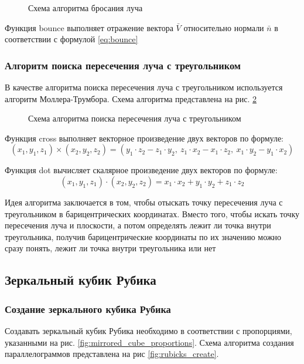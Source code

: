 \begin{figure}[!ht]
	\caption{Схема алгоритма бросания луча}
	\label{fig:throw_ray}
\end{figure}

Функция bounce выполняет отражение вектора $\bar V$ относительно нормали $\bar n$ в соответствии с формулой \ref{eq:bounce}

\subsubsection{Алгоритм поиска пересечения луча с треугольником}
В качестве алгоритма поиска пересечения луча с треугольником используется алгоритм Моллера-Трумбора\cite{bib:mollertrumbor}. Схема алгоритма представлена на рис. \ref{fig:triangle_intersec}
\begin{figure}[!ht]
	\caption{Схема алгоритма поиска пересечения луча с треугольником}
	\label{fig:triangle_intersec}
\end{figure}

Функция cross выполняет векторное произведение двух векторов по формуле:
\begin{equation}
	(x_1, y_1, z_1)\times(x_2, y_2, z_2)=(y_1\cdot z_2-z_1\cdot y_2,~z_1\cdot x_2-x_1\cdot z_2,~x_1\cdot y_2-y_1\cdot x_2)
\end{equation}

Функция dot вычисляет скалярное произведение двух векторов по формуле:
\begin{equation}
	(x_1, y_1, z_1)\cdot(x_2, y_2, z_2) = x_1\cdot x_2+y_1\cdot y_2+z_1\cdot z_2
\end{equation}

Идея алгоритма заключается в том, чтобы отыскать точку пересечения луча с треугольником в барицентрических координатах. Вместо того, чтобы искать точку пересечения луча и плоскости, а потом определять лежит ли точка внутри треугольника, получив барицентрические координаты по их значению можно сразу понять, лежит ли точка внутри треугольника или нет

\subsection{Зеркальный кубик Рубика}
\subsubsection{Создание зеркального кубика Рубика}
Создавать зеркальный кубик Рубика необходимо в соответствии с пропорциями, указанными на рис. \ref{fig:mirrored_cube_proportions}. Схема алгоритма создания параллелограммов представлена на рис \ref{fig:rubicks_create}.

